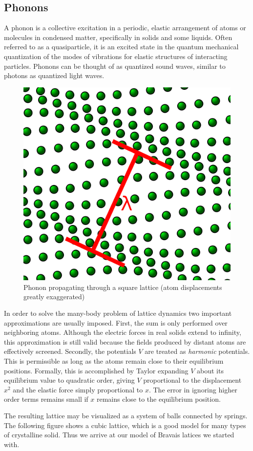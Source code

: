 \documentclass[%
 aip,
 amsmath,amssymb,
 reprint, floatfix%
]{revtex4-1}
\begin{document}
    \subsection{Phonons}
    A phonon is a collective excitation in a periodic, elastic arrangement of atoms or molecules in condensed matter, specifically in solids and some liquids. Often referred to as a quasiparticle, it is an excited state in the quantum mechanical quantization of the modes of vibrations for elastic structures of interacting particles. Phonons can be thought of as quantized sound waves, similar to photons as quantized light waves.
    \begin{figure}
        \centering
        \includegraphics[scale = 0.40]{Figures/506px-Lattice_wave.svg.png}
        \caption{Phonon propagating through a square lattice (atom displacements greatly exaggerated)}
        \label{fig:phonon}
    \end{figure}
    \par
    In order to solve the many-body problem of lattice dynamics two important approximations are usually imposed. First, the sum is only performed over neighboring atoms. Although the electric forces in real solids extend to infinity, this approximation is still valid because the fields produced by distant atoms are effectively screened. Secondly, the potentials $V$ are treated as \textit{harmonic} potentials. This is permissible as long as the atoms remain close to their equilibrium positions. Formally, this is accomplished by Taylor expanding $V$ about its equilibrium value to quadratic order, giving $V$ proportional to the displacement $x^2$ and the elastic force simply proportional to $x$. The error in ignoring higher order terms remains small if $x$ remains close to the equilibrium position.
    \par
    The resulting lattice may be visualized as a system of balls connected by springs. The following figure shows a cubic lattice, which is a good model for many types of crystalline solid. Thus we arrive at our model of Bravais latices we started with.
\end{document}
